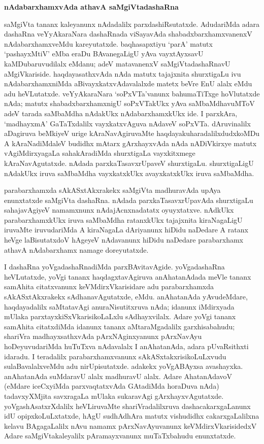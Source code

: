 \begin{center}
{\Large\bf nAdabarxhamxvAda athavA saMgiVtadashaRna}
\end{center}

saMgiVta tananx kaleyanunx nAdadalilx parxdashiRsutatxde. AdudariMda adara dashaRna veYyAkaraNara dashaRnada viSayavAda shabadxbarxhamxvanenxV nAdabarxhamxveMdu kareyutatxde. baqhasapxtiyu `parA' matutx `pashayxMtiV' eMba eraDu BAvanegaLigU yAva vayxtAyxsavU kaMDubaruvudilalx eMdanu; adeV matavanenxV saMgiVtadashaRnavU aMgiVkariside. haqdayasathxvAda nAda matutx tajajxnita shurxtigaLu ivu nAdabarxhamxniMda aBivayxkatxvAdavalalxde matetx beVre EnU alalx eMdu adu heVLutatxde. veYyAkaraNara `soPxVTa'vanunx bahumaTiTxge hoVlutatxde nAda; matutx shabadxbarxhamxnigU soPxVTakUkx yAva saMbaMdhavuMToV adeV tarada saMbaMdha nAdakUkx nAdabarxhamxkUkx ide. I parxkAra, `madhayxmA' GaTaTxdalilx vayxkatxvAguva nAdaveV soPxVTa. dAruvinalilx aDagiruva beMkiyeV urige kAraNavAgiruvaMte haqdayakuharadalilxdudxkoMDu A kAraNadiMdaleV budidhx mAtarx gArxhayxvAda nAda nADiVkirxye matutx vAgiMdirxyagaLa sahakAradiMda shurxtigaLa vayxkitxmege kAraNavAgutatxde. nAdada parxkaTasavxrUpaveV shurxtigaLu. shurxtigaLigU nAdakUkx iruva saMbaMdha vayxkatxkUkx avayxkatxkUkx iruva saMbaMdha.

parabarxhamxda sAkASxtAkxrakekx saMgiVta madhuravAda upAya enunxtatxde saMgiVta dashaRna. nAdada parxkaTasavxrUpavAda shurxtigaLu sahajavAgiyeV namamxnunx nAdajAcnxnadatatx oyuyxtatxve. nAdkUkx parabarxhamxkUkx iruva saMbaMdha ratanxkUkx tajajxnita kiraNagaLigU iruvaMte iruvudariMda A kiraNagaLa dAriyanunx hiDidu naDedare A ratanx heVge laBisutatxdoV hAgeyeV nAdavanunx hiDidu naDedare parabarxhamx athavA nAdabarxhamx namage doreyutatxde.

I dashaRna yoVgadashaRnadiMda parxBAvitavAgide. yoVgadashaRna heVLutatxde, yoVgi tananx haqdagxtavAgiruva anAhatanAdada meVle tananx samAhita citatxvanunx keVMdirxV\-karisidare adu parabarxhamxda sAkASxtAkxrakekx sAdhanavAgutatxde, eMdu. anAhatanAda yAvu\-deMdare, haqdayadalilx saMtatavAgi anuraNisutitxruva nAda; idanunx iMdirxyada mUlaka parxtayxkiSxVkarisikoLaLxlu sAdhayxvilalx. Adare yoVgi tananx samAhita citatxdiMda idanunx tananx aMtaraMgadalilx garxhisabahudu; shariVra madhayxsathxvAda pArxNAginxyanunx pArxNa\-vAyu hoDeyuvudariMda huTuTxva nAdavalalx I anAhatanAda, adara pUvaR\-sithxti idaradu. I teradalilx parabarxhamxvanunx sAkASxtakxrisikoLuLxvudu sulaBavalalxveMdu adu nirUpisutatxde. adakekx yoVgABAyxsa avashayxka. anAhatanAda suMdaravU alalx madhu\-ravU alalx. Adare AhatanAdavoV (eMdare iceCxyiMda parxvaqtatxvAda GAtadiMda hora\-Duva nAda) tadavxyXMjita savxragaLa mUlaka sukaravAgi gArxhayxvAgutatxde. yoVga\-shAsatxrX\-dalilx heVLiruvaMte shariVradalilxruva dashacakarxgaLanunx idU opipxkoLuLxtatxde, hAgU sudhA\-dhAra matutx vishudidhx cakarxgaLalilxna kelavu BAgagaLalilx nAvu namamx pArxNavAyuvanunx keVMdirxVkari\-sidedxV Adare saMgiVtakaleyalilx pAramayxvanunx muTaTxbahudu enunxtatxde.

